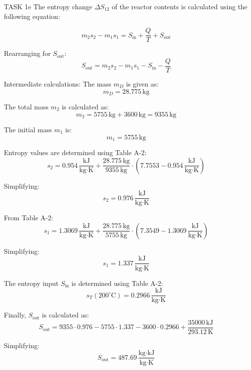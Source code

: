 TASK 1e  
The entropy change \( \Delta S_{12} \) of the reactor contents is calculated using the following equation:  

\[
m_{2} s_{2} - m_{1} s_{1} = S_{\text{in}} + \frac{Q}{T} + S_{\text{out}}
\]  

Rearranging for \( S_{\text{out}} \):  
\[
S_{\text{out}} = m_{2} s_{2} - m_{1} s_{1} - S_{\text{in}} - \frac{Q}{T}
\]  

Intermediate calculations:  
The mass \( m_{D} \) is given as:  
\[
m_{D} = 28.775 \, \text{kg}
\]  

The total mass \( m_{2} \) is calculated as:  
\[
m_{2} = 5755 \, \text{kg} + 3600 \, \text{kg} = 9355 \, \text{kg}
\]  

The initial mass \( m_{1} \) is:  
\[
m_{1} = 5755 \, \text{kg}
\]  

Entropy values are determined using Table A-2:  
\[
s_{2} = 0.954 \, \frac{\text{kJ}}{\text{kg·K}} + \frac{28.775 \, \text{kg}}{9355 \, \text{kg}} \cdot (7.7553 - 0.954 \, \frac{\text{kJ}}{\text{kg·K}})
\]  

Simplifying:  
\[
s_{2} = 0.976 \, \frac{\text{kJ}}{\text{kg·K}}
\]  

From Table A-2:  
\[
s_{1} = 1.3069 \, \frac{\text{kJ}}{\text{kg·K}} + \frac{28.775 \, \text{kg}}{5755 \, \text{kg}} \cdot (7.3549 - 1.3069 \, \frac{\text{kJ}}{\text{kg·K}})
\]  

Simplifying:  
\[
s_{1} = 1.337 \, \frac{\text{kJ}}{\text{kg·K}}
\]  

The entropy input \( S_{\text{in}} \) is determined using Table A-2:  
\[
s_{T}(200^\circ\text{C}) = 0.2966 \, \frac{\text{kJ}}{\text{kg·K}}
\]  

Finally, \( S_{\text{out}} \) is calculated as:  
\[
S_{\text{out}} = 9355 \cdot 0.976 - 5755 \cdot 1.337 - 3600 \cdot 0.2966 + \frac{35000 \, \text{kJ}}{293.12 \, \text{K}}
\]  

Simplifying:  
\[
S_{\text{out}} = 487.69 \, \frac{\text{kg·kJ}}{\text{kg·K}}
\]